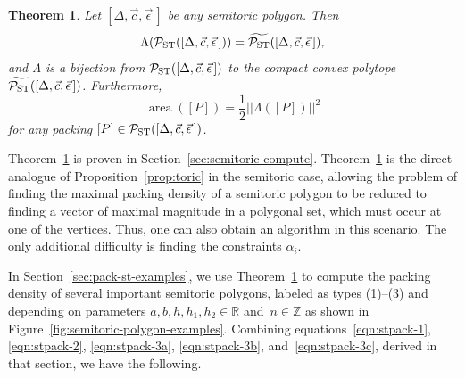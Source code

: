 \documentclass[10pt,a4paper]{amsart}
\numberwithin{equation}{section}
\newtheorem{Theorem}{Theorem}[section]
\def\R{{\mathbb R}}
\def\Z{{\mathbb Z}}
\newcommand{\De}{\Delta}
\newcommand{\area}{\operatorname{area}}
\newcommand{\PST}{\mathcal{P}_{\rm ST}}
\newcommand{\PSTtilde}{\widetilde{\mathcal{P}_{\rm ST}}}
\newcommand{\stpoly}{[\De,\vec{c},\vec{\epsilon}\,]}
\theoremstyle{definition}
\theoremstyle{plain}
\theoremstyle{plain}
\begin{document}
\begin{Theorem}\label{thm:semitoric}
 Let $\stpoly$ be any semitoric polygon. Then
 \[
 \Lambda(\PST(\stpoly)) = \PSTtilde(\stpoly),
 \]
 and $\Lambda$ is a bijection from $\PST(\stpoly)$ to the compact convex polytope $\PSTtilde(\stpoly)$.
 Furthermore,
 \[
 \area([P]) = \frac{1}{2}||\Lambda([P])||^2
 \]
 for any packing $[P]\in\PST(\stpoly)$.
\end{Theorem}


Theorem~\ref{thm:semitoric} is proven in Section~\ref{sec:semitoric-compute}. Theorem~\ref{thm:semitoric} is the direct analogue of Proposition~\ref{prop:toric} in the semitoric case, allowing the problem of finding the maximal packing density of a semitoric polygon to be reduced to finding a vector of maximal magnitude in a polygonal set, which must occur at one of the vertices. Thus, one can also obtain an algorithm in this scenario. The only additional difficulty is finding the constraints $\alpha_i$.

In Section~\ref{sec:pack-st-examples}, we use Theorem~\ref{thm:semitoric} to compute the packing density of several important semitoric polygons,
labeled as types (1)--(3) and depending on parameters $a,b, h, h_1, h_2\in\R$ and~$n\in\Z$ as shown in Figure~\ref{fig:semitoric-polygon-examples}.
Combining equations~\eqref{eqn:stpack-1}, \eqref{eqn:stpack-2}, \eqref{eqn:stpack-3a}, \eqref{eqn:stpack-3b}, and~\eqref{eqn:stpack-3c}, derived in that section, we have the following.
\end{document}
